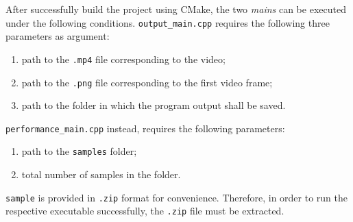 \noindent
After successfully build the project using CMake, the two \textit{mains} can be executed under the following conditions.
\verb|output_main.cpp| requires the following three parameters as argument:
\begin{enumerate}
    \item path to the \verb|.mp4| file corresponding to the video;
    \item path to the \verb|.png| file corresponding to the first video frame;
    \item path to the folder in which the program output shall be saved.
\end{enumerate}

\noindent
\verb|performance_main.cpp| instead, requires the following parameters:
\begin{enumerate}
    \item path to the \verb|samples| folder;
    \item total number of samples in the folder.
\end{enumerate}
\verb|sample| is provided in \verb|.zip| format for convenience. Therefore, in order to run the respective executable
successfully, the \verb|.zip| file must be extracted.
